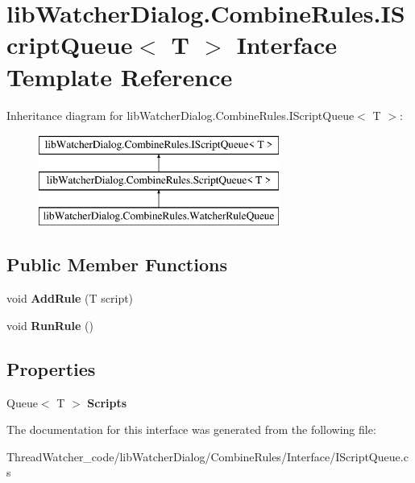 \hypertarget{interfacelib_watcher_dialog_1_1_combine_rules_1_1_i_script_queue_3_01_t_01_4}{\section{lib\+Watcher\+Dialog.\+Combine\+Rules.\+I\+Script\+Queue$<$ T $>$ Interface Template Reference}
\label{interfacelib_watcher_dialog_1_1_combine_rules_1_1_i_script_queue_3_01_t_01_4}
}
Inheritance diagram for lib\+Watcher\+Dialog.\+Combine\+Rules.\+I\+Script\+Queue$<$ T $>$\+:\begin{figure}[H]
\begin{center}
\leavevmode
\includegraphics[height=3.000000cm]{interfacelib_watcher_dialog_1_1_combine_rules_1_1_i_script_queue_3_01_t_01_4}
\end{center}
\end{figure}
\subsection*{Public Member Functions}
\begin{DoxyCompactItemize}
\item 
\hypertarget{interfacelib_watcher_dialog_1_1_combine_rules_1_1_i_script_queue_3_01_t_01_4_a5bf0c2bb642a64934d943f3bd07bee66}{void {\bfseries Add\+Rule} (T script)}\label{interfacelib_watcher_dialog_1_1_combine_rules_1_1_i_script_queue_3_01_t_01_4_a5bf0c2bb642a64934d943f3bd07bee66}

\item 
\hypertarget{interfacelib_watcher_dialog_1_1_combine_rules_1_1_i_script_queue_3_01_t_01_4_aa24c32fde0f4471bcf57b6a127dbe787}{void {\bfseries Run\+Rule} ()}\label{interfacelib_watcher_dialog_1_1_combine_rules_1_1_i_script_queue_3_01_t_01_4_aa24c32fde0f4471bcf57b6a127dbe787}

\end{DoxyCompactItemize}
\subsection*{Properties}
\begin{DoxyCompactItemize}
\item 
\hypertarget{interfacelib_watcher_dialog_1_1_combine_rules_1_1_i_script_queue_3_01_t_01_4_ae7f951455ee330ba639ae844022bfa14}{Queue$<$ T $>$ {\bfseries Scripts}}\label{interfacelib_watcher_dialog_1_1_combine_rules_1_1_i_script_queue_3_01_t_01_4_ae7f951455ee330ba639ae844022bfa14}

\end{DoxyCompactItemize}


The documentation for this interface was generated from the following file\+:\begin{DoxyCompactItemize}
\item 
Thread\+Watcher\+\_\+code/lib\+Watcher\+Dialog/\+Combine\+Rules/\+Interface/I\+Script\+Queue.\+cs\end{DoxyCompactItemize}
